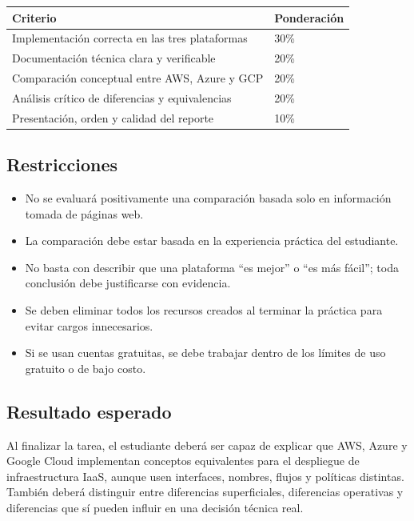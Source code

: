 \documentclass[
  coursetitle={Cómputo Nube y Tecnologías Emergentes},
  coursehours={96},
  coursedate={Verano 2026},
  doctype={Tarea 1},
  otherlangs={english,french},
  authorname={Lázaro},
  authorsurname={Bustio-Martínez},
  authortitle={PhD},
  role={Profesor Investigador},
  email={lbustio@inaoe.mx},
  phone={5559504000},
  ext={7459},
  institution={Instituto Nacional de Astrofísica, Óptica y Electrónica (INAOE)},
  department={Maestría en Ciencias en Tecnologías de Seguridad},
  address={Luis Enrique Erro 1, Sta. Ma. Tonantzintla, San Andrés Cholula, CP 72840, Puebla, México},
  margin={0.5in}
]{../../../lbustio_lecture_notes}
\begin{document}
\begin{center}
\begin{tabular}{|p{}|p{}|}
\hline
\textbf{Criterio} & \textbf{Ponderación} \\
\hline
Implementación correcta en las tres plataformas & 30\% \\
\hline
Documentación técnica clara y verificable & 20\% \\
\hline
Comparación conceptual entre AWS, Azure y GCP & 20\% \\
\hline
Análisis crítico de diferencias y equivalencias & 20\% \\
\hline
Presentación, orden y calidad del reporte & 10\% \\
\hline
\end{tabular}
\end{center}

\subsection{Restricciones}
\label{sec:tarea1-restricciones}

\begin{itemize}
  \item No se evaluará positivamente una comparación basada solo en información tomada de páginas web.
  \item La comparación debe estar basada en la experiencia práctica del estudiante.
  \item No basta con describir que una plataforma ``es mejor'' o ``es más fácil''; toda conclusión debe justificarse con evidencia.
  \item Se deben eliminar todos los recursos creados al terminar la práctica para evitar cargos innecesarios.
  \item Si se usan cuentas gratuitas, se debe trabajar dentro de los límites de uso gratuito o de bajo costo.
\end{itemize}

\subsection{Resultado esperado}
\label{sec:tarea1-resultado}

Al finalizar la tarea, el estudiante deberá ser capaz de explicar que AWS, Azure y Google Cloud implementan conceptos equivalentes para el despliegue de infraestructura IaaS, aunque usen interfaces, nombres, flujos y políticas distintas. También deberá distinguir entre diferencias superficiales, diferencias operativas y diferencias que sí pueden influir en una decisión técnica real.
\end{document}
